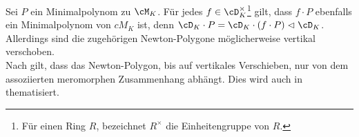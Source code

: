 \begin{comment}
\begin{bem}
Zur vorstellung der Eigenschaft Regulär \dots
\begin{itemize}
\item $P_1=x(x\partial_x+1)$ regulär mit Lösung $\frac{1}{x}$
\item $P_2=x^2\partial_x+1$ irrregulär mit Lösung $e^{\frac{1}{x}}$
\end{itemize}
\end{bem}
\end{comment}

\begin{bem} \label{bem:NPverschieben}
Sei $P$ ein Minimalpolynom zu $\cM_K$.
Für jedes $f\in\cD_K^\times$\footnote{
Für einen Ring $R$, bezeichnet $R^\times$ die Einheitengruppe von $R$.
} gilt, dass $f\cdot P$ ebenfalls ein Minimalpolynom von $cM_K$ ist, denn
$\cD_K\cdot P=\cD_K\cdot (f\cdot P)\vartriangleleft \cD_K$.
Allerdings sind die zugehörigen Newton-Polygone möglicherweise vertikal
verschoben.\\
Nach \cite[Seite 25]{sabbah_cimpa90} gilt, dass das Newton-Polygon, bis auf
vertikales Verschieben, nur von dem assoziierten meromorphen Zusammenhang
abhängt.
Dies wird auch in \cite[Bem 5.4]{ZulaBarbara} thematisiert.
\end{bem}

